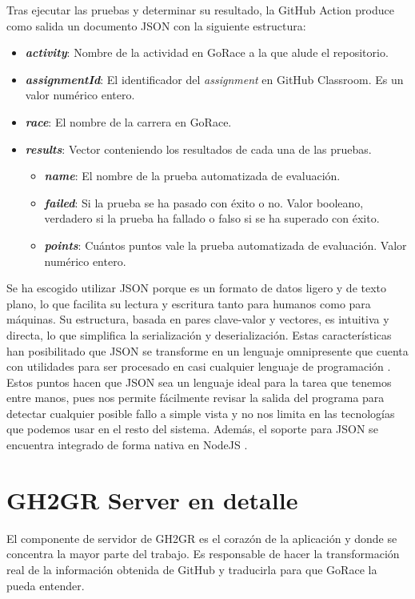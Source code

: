Tras ejecutar las pruebas y determinar su resultado, la GitHub Action produce como salida un documento \acrshort{JSON} con la siguiente estructura:
\begin{itemize}
    \item \textbf{\textit{activity}}: Nombre de la actividad en GoRace a la que alude el repositorio.
    \item \textbf{\textit{assignmentId}}: El identificador del \textit{assignment} en GitHub Classroom. Es un valor numérico entero.
    \item \textbf{\textit{race}}: El nombre de la carrera en GoRace.
    \item \textbf{\textit{results}}: Vector conteniendo los resultados de cada una de las pruebas.
    \begin{itemize}
        \item \textbf{\textit{name}}: El nombre de la prueba automatizada de evaluación.
        \item \textbf{\textit{failed}}: Si la prueba se ha pasado con éxito o no. Valor booleano, verdadero si la prueba ha fallado o falso si se ha superado con éxito.
        \item \textbf{\textit{points}}: Cuántos puntos vale la prueba automatizada de evaluación. Valor numérico entero.
    \end{itemize}
\end{itemize}

Se ha escogido utilizar \acrshort{JSON} porque es un formato de datos ligero y de texto plano, lo que facilita su lectura y escritura tanto para humanos como para máquinas. Su estructura, basada en pares clave-valor y vectores, es intuitiva y directa, lo que simplifica la serialización y deserialización. Estas características han posibilitado que \acrshort{JSON} se transforme en un lenguaje omnipresente que cuenta con utilidades para ser procesado en casi cualquier lenguaje de programación \cite{jsonJSON}. Estos puntos hacen que \acrshort{JSON} sea un lenguaje ideal para la tarea que tenemos entre manos, pues nos permite fácilmente revisar la salida del programa para detectar cualquier posible fallo a simple vista y no nos limita en las tecnologías que podemos usar en el resto del sistema. Además, el soporte para \acrshort{JSON} se encuentra integrado de forma nativa en NodeJS \cite{ecma262}.

\section{GH2GR Server en detalle}
El componente de servidor de GH2GR es el corazón de la aplicación y donde se concentra la mayor parte del trabajo. Es responsable de hacer la transformación real de la información obtenida de GitHub y traducirla para que GoRace la pueda entender.

